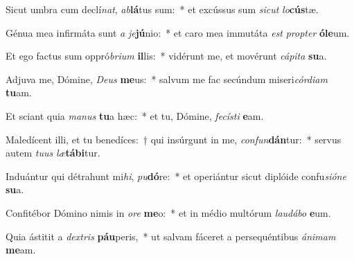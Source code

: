 \item Sicut umbra cum declí\textit{nat}, \textit{ab}\textbf{lá}tus sum:~* et excússus sum \textit{sic}\textit{ut} \textit{lo}\textbf{cús}tæ.
\item Génua mea infirmáta sunt \textit{a} \textit{je}\textbf{jú}nio:~* et caro mea immutáta \textit{est} \textit{prop}\textit{ter} \textbf{ó}\textbf{le}um.
\item Et ego factus sum oppró\textit{bri}\textit{um} \textbf{il}lis:~* vidérunt me, et movérunt \textit{cá}\textit{pi}\textit{ta} \textbf{su}a.
\item Adjuva me, Dómine, \textit{De}\textit{us} \textbf{me}us:~* salvum me fac secúndum miseri\textit{cór}\textit{di}\textit{am} \textbf{tu}am.
\item Et sciant quia \textit{ma}\textit{nus} \textbf{tu}a hæc:~* et tu, Dómine, \textit{fe}\textit{cís}\textit{ti} \textbf{e}am.
\item Maledícent illi, et tu benedíces:~† qui insúrgunt in me, \textit{con}\textit{fun}\textbf{dán}tur:~* servus autem \textit{tu}\textit{us} \textit{læ}\textbf{tá}\textbf{bi}tur.
\item Induántur qui détrahunt mi\textit{hi}, \textit{pu}\textbf{dó}re:~* et operiántur sicut diplóide confu\textit{si}\textit{ó}\textit{ne} \textbf{su}a.
\item Confitébor Dómino nimis in \textit{o}\textit{re} \textbf{me}o:~* et in médio multórum \textit{lau}\textit{dá}\textit{bo} \textbf{e}um.
\item Quia ástitit a \textit{dex}\textit{tris} \textbf{páu}peris,~* ut salvam fáceret a persequéntibus \textit{á}\textit{ni}\textit{mam} \textbf{me}am.
